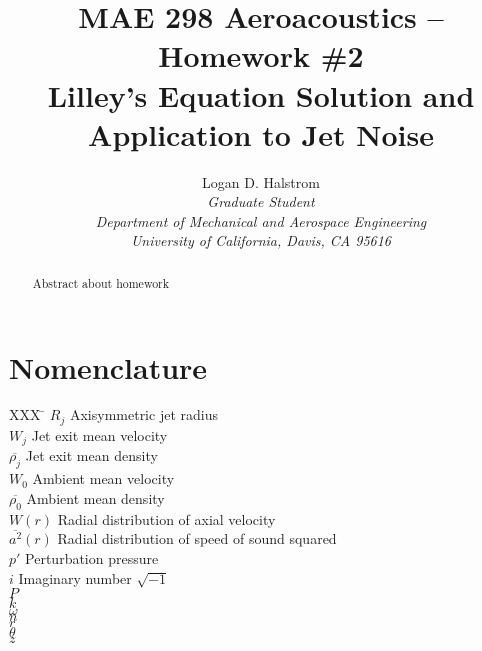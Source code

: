 \documentclass[]{aiaa-tc}%
\title{MAE 298 Aeroacoustics -- Homework \#2 \\ Lilley's Equation Solution and Application to Jet Noise}
\author{
  Logan D. Halstrom \\
  {\normalsize\itshape Graduate Student} \\
  {\normalsize\itshape Department of Mechanical and Aerospace Engineering} \\
  {\normalsize\itshape University of California, Davis, CA 95616}
       }
\begin{document}
\maketitle

\begin{abstract}

Abstract about homework

\end{abstract}

\section*{Nomenclature}

\begin{multicols}{2}

\begin{tabbing}
  XXX \= \kill%
  $R_j$               \> Axisymmetric jet radius \\
  $W_j$               \> Jet exit mean velocity \\
  $\overline{\rho_j}$ \> Jet exit mean density \\
  $W_0$               \> Ambient mean velocity \\
  $\overline{\rho_0}$ \> Ambient mean density \\
  $W(r)$              \> Radial distribution of axial velocity \\
  $\overline{a^2}(r)$ \> Radial distribution of speed of sound squared\\
  $p'$                \> Perturbation pressure \\
  $i$                 \> Imaginary number $\sqrt{-1}$ \\
  $P$                 \>  \\
  $k$                 \>  \\
  $\omega$            \>  \\
  $n$                 \>  \\
  $r$                 \>  \\
  $\theta$            \>  \\
  $z$                 \>  \\



\end{tabbing}

\end{multicols}
\end{document}
